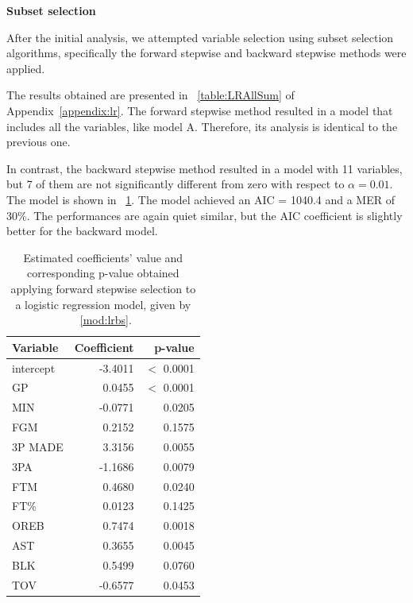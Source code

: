 \vspace{0.2cm}
\noindent
\textbf{Subset selection}

After the initial analysis, we attempted variable selection using subset selection algorithms, specifically the forward stepwise and backward stepwise methods were applied. 

The results obtained are presented in \Tab~\ref{table:LRAllSum} of Appendix~\ref{appendix:lr}. The forward stepwise method resulted in a model that includes all the variables, like model A. Therefore, its analysis is identical to the previous one.

In contrast, the backward stepwise method resulted in a model with 11 variables, but 7 of them are not significantly different from zero with respect to $\alpha = 0.01$. The model is shown in \Tab~\ref{table:LRBSSum}. The model achieved an AIC = 1040.4 and a MER of $30\%$. The performances are again quiet similar, but the AIC coefficient is slightly better for the backward model.

\begin{center}
\end{center}

\begin{table}[h]
	\centering
	\begin{tabular}{|| l | r | r ||} 
		\hline
		Variable & Coefficient & p-value \\
		\hline
		\hline
		intercept & -3.4011 & $<$ 0.0001 \\
		GP & 0.0455 & $<$ 0.0001 \\
		MIN & -0.0771 & 0.0205 \\
		FGM & 0.2152 & 0.1575 \\
		3P MADE & 3.3156 & 0.0055 \\
		3PA & -1.1686 & 0.0079 \\
		FTM & 0.4680 & 0.0240 \\
		FT\% & 0.0123 & 0.1425 \\
		OREB & 0.7474 & 0.0018 \\
		AST & 0.3655 & 0.0045 \\
		BLK & 0.5499 & 0.0760 \\				
		TOV & -0.6577 & 0.0453 \\
		\hline
	\end{tabular}
	\caption{Estimated coefficients' value and corresponding p-value obtained applying forward stepwise selection to a logistic regression model, given by \Mod~\ref{mod:lrbs}.}
	\label{table:LRBSSum}
\end{table}


